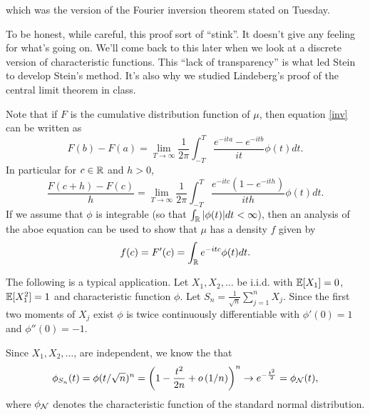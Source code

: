 which was the version of the Fourier inversion theorem stated on Tuesday.
\begin{remark}
    To be honest, while careful, this proof sort of ``stink''. It doesn't give any feeling for what's going on. We'll come back to this later when we look at a discrete version of characteristic functions. This ``lack of transparency'' is what led Stein to develop Stein's method. It's also why we studied Lindeberg's proof of the central limit theorem in class.
\end{remark}
\begin{remark}
    Note that if $F$ is the cumulative distribution function of $\mu$, then equation \eqref{inv} can be written as 
    \[F(b)-F(a) = \lim_{T \to \infty} \frac{1}{2\pi}\int_{-T}^T \frac{e^{-ita}-e^{-itb}}{it}\phi(t)dt. \]
    In particular for $c \in {\mathbb R}$ and $h>0$,
    \[\frac{F(c+h)-F(c)}{h} =\lim_{T \to \infty} \frac{1}{2\pi}\int_{-T}^T \frac{e^{-itc}(1-e^{-ith})}{ith}\phi(t)dt. \]
    If we assume that $\phi$ is integrable (so that $\int_{\mathbb R} {\left\lvert\phi(t)\right\rvert}dt < \infty$), then an analysis of the aboe equation can be used to show that $\mu$ has a density $f$ given by
    \[f(c) = F'(c) = \int_{\mathbb R} e^{-itc}\phi(t)dt. \]
\end{remark}
\begin{ex}
    The following is a typical application. Let $X_1,X_2,\ldots$ be i.i.d. with ${\mathbb{E}}[X_1]=0$, ${\mathbb{E}}[X_1^2]=1$ and characteristic function $\phi$. Let $S_n = \frac{1}{\sqrt{n}}\sum_{j=1}^n X_j$. Since the first two moments of $X_j$ exist $\phi$ is twice continuously differentiable with $\phi'(0)=1$ and $\phi''(0)=-1$. 

    Since $X_1,X_2,\ldots$, are independent, we know the that
    \[\phi_{S_n}(t)=\phi(t/\sqrt{n})^n = \left(1-\frac{t^2}{2n}+o\left(1/n\right)\right)^n \to e^{-\frac{t^2}{2}} =\phi_{{{\mathcal{N}}}}(t), \]
    where $\phi_{{\mathcal{N}}}$ denotes the characteristic function of the standard normal distribution.
\end{ex}
